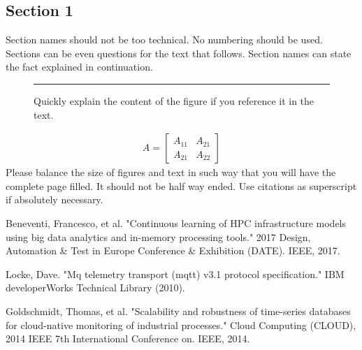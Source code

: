 \documentclass[a4paper, twoside]{article}
\begin{document}
\begin{multicols}{3}
\section*{Section 1}
Section names should not be too technical. No numbering should be used. Sections can be even questions for the text that follows. Section names can state the fact explained in continuation.

\begin{figure}[H]
  \color{yellow}\rule{\linewidth}{3cm}\color{black}
  \caption{Quickly explain the content of the figure if you reference it in
    the text.}
  \label{fig:vortex}
\end{figure}


\begin{align}
 A = 
 \begin{bmatrix}
 A_{11} & A_{21} \\
 A_{21} & A_{22}
 \end{bmatrix}
 \end{align}
Please balance the size of figures and text in such way that you will have the complete page filled. It should not be half way ended. Use citations as superscript\cite{Figueredo:2009dg} if absolutely necessary.
\newcommand{\sohpcinfo}[1]{\par\vspace{1ex}\footnotesize
  \textcolor{prace-lightblue}{PRACE SoHPC}%
  \textcolor{prace-darkblue}{#1}\\[0.5ex]\scriptsize
}

\renewcommand\refname{\usefont{OT1}{phv}{m}{n}\selectfont\small{References}}
\begin{thebibliography}{9}
\vspace*{-1ex}  %
\scriptsize
{}
Beneventi, Francesco, et al. "Continuous learning of HPC infrastructure models using big data analytics and in-memory processing tools." 2017 Design, Automation \& Test in Europe Conference \& Exhibition (DATE). IEEE, 2017.

Locke, Dave. "Mq telemetry transport (mqtt) v3.1 protocol specification." IBM developerWorks Technical Library (2010).

Goldschmidt, Thomas, et al. "Scalability and robustness of time-series databases for cloud-native monitoring of industrial processes." Cloud Computing (CLOUD), 2014 IEEE 7th International Conference on. IEEE, 2014.


\end{thebibliography}
\end{multicols}
\end{document}
